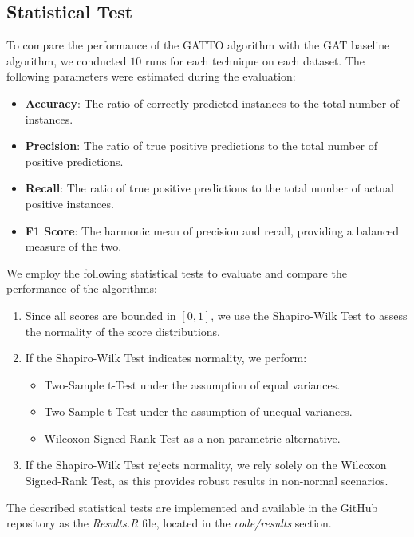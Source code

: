 \documentclass[12pt,conference]{ieeeconf} %
\begin{document}
\subsection{Statistical Test}
To compare the performance of the GATTO algorithm with the GAT baseline algorithm, we conducted $10$ runs for each technique on each dataset. The following parameters were estimated during the evaluation:
\begin{itemize} 
    \item \textbf{Accuracy}: The ratio of correctly predicted instances to the total number of instances. 
    \item \textbf{Precision}: The ratio of true positive predictions to the total number of positive predictions. 
    \item \textbf{Recall}: The ratio of true positive predictions to the total number of actual positive instances. 
    \item \textbf{F1 Score}: The harmonic mean of precision and recall, providing a balanced measure of the two. 
\end{itemize}
We employ the following statistical tests to evaluate and compare the performance of the algorithms:
\begin{enumerate} 
    \item Since all scores are bounded in $[0,1]$, we use the Shapiro-Wilk Test to assess the normality of the score distributions. 
    \item If the Shapiro-Wilk Test indicates normality, we perform: 
        \begin{itemize} 
            \item Two-Sample t-Test under the assumption of equal variances. 
            \item Two-Sample t-Test under the assumption of unequal variances. 
            \item Wilcoxon Signed-Rank Test as a non-parametric alternative. 
        \end{itemize} 
        \item If the Shapiro-Wilk Test rejects normality, we rely solely on the Wilcoxon Signed-Rank Test, as this provides robust results in non-normal scenarios. 
\end{enumerate}
The described statistical tests are implemented and available in the GitHub repository as the \textit{Results.R} file, located in the \textit{code/results} section.

\end{document}
